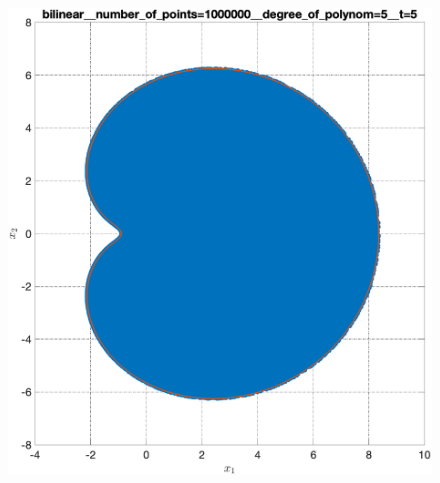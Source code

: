 \documentclass[../main.tex]{subfiles}
\begin{document}
\begin{figure}[ht!]
\begin{minipage}[b]{.3\linewidth}
  	\end{minipage}
  	\vfill
  	\hspace{-2.5ex}
  	\begin{minipage}[b]{.3\linewidth} 
  		\small
  		\centering
  		\includegraphics[width=\linewidth]{images/bilinear__number_of_points=1000000__degree_of_polynom=5__t=5.eps}
  	\end{minipage} 
  	\hfill
  	\begin{minipage}[b]{.3\linewidth} 
  		\small
  		\centering 

\end{minipage}
\end{figure}
\end{document}
